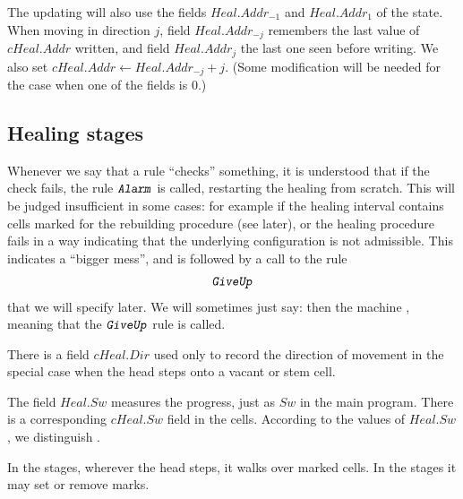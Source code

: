 \documentclass[12pt]{memoir}
\newcommand{\authnote}[3]
{\text{{ \textcolor{#3}{\( \langle\hspace{-0.2em}\langle \)\textsf{\footnotesize #1: #2}\( \rangle\hspace{-0.2em}\rangle \)}}}}
\newcommand{\authnote}[2]{}
\newcommand{\Pnote}[1]{{\authnote{Peter}{#1}{cyan}}}
\newcommand{\fld}[1]{\ensuremath{\textit{#1}}}
\newcommand{\rul}[1]{\ensuremath{\texttt{\slshape #1\/}}}
\newcommand{\Addr}{\fld{Addr}}
\newcommand{\Dir}{\fld{Dir}}
\newcommand{\Heal}{\fld{Heal}}
\newcommand{\cHeal}{\fld{cHeal}}
\newcommand{\Stage}{\fld{Stage}}
\newcommand{\Sweep}{\fld{Sw}}
\newcommand{\Committing}{\mathrm{Committing}}
\newcommand{\Planning}{\mathrm{Planing}}
\newcommand{\Alarm}{\rul{Alarm}}
\newcommand{\GiveUp}{\rul{GiveUp}}
\begin{document}
The updating will also use the fields
\( \Heal.\Addr_{-1} \) and \( \Heal.\Addr_{1} \) of the state.
When moving in direction \( j \), field \( \Heal.\Addr_{-j} \) remembers the last
value of \( \cHeal.\Addr \) written, and field \( \Heal.\Addr_{j} \) the last one seen 
before writing.
We also set \( \cHeal.\Addr\gets\Heal.\Addr_{-j}+j \).
(Some modification will be needed for the case when one of the fields is 0.) \Pnote{!}

\subsection{Healing stages}\label{sec:rec-stages}

Whenever we say that a rule ``checks'' something,
it is understood that if the check fails, the rule \( \Alarm \) is called, restarting the 
healing from scratch.
This will be judged insufficient in some cases: for example if 
the healing interval contains cells marked for the rebuilding procedure (see later),
or the healing procedure fails in a way
indicating that the underlying configuration is not admissible.
This indicates a ``bigger mess'', and is followed by a call to the rule
\begin{align*}
 \GiveUp 
 \end{align*}
that we will specify later.
We will sometimes just say: then the machine , meaning that the
\( \GiveUp \) rule is called.

There is a field \( \cHeal.\Dir \) used only to record the direction
of movement in the special case when the head steps onto a vacant or stem cell.

The field \( \Heal.\Sweep \) 
measures the progress, just as \( \Sweep \) in the main program.
There is a corresponding \( \cHeal.\Sweep \) field in the cells.
According to the values of \( \Heal.\Sweep \), we distinguish .

In the  stages, wherever the head steps, it walks over marked cells.
In the  stages it may set or remove marks.
\end{document}
